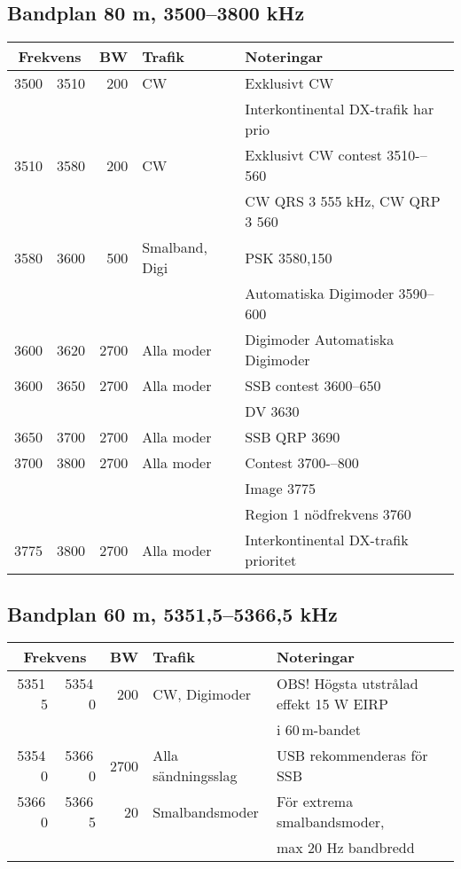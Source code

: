 {\subsection{Bandplan 80 m, 3500--3800 kHz}
\begin{tabular}{rrrll}
\multicolumn{2}{c}{\textbf{Frekvens}} & \textbf{BW} & \textbf{Trafik} & \textbf{Noteringar} \\ \hline
3500 & 3510 & 200  & CW             & Exklusivt CW                         \\
      &       &      &                & Interkontinental DX-trafik har prio  \\ \hline
3510 & 3580 & 200  & CW             & Exklusivt CW contest 3510-–560       \\
      &       &      &                & CW QRS 3 555 kHz, CW QRP 3 560       \\ \hline
3580 & 3600 & 500  & Smalband, Digi & PSK 3580,150                        \\
      &       &      &                & Automatiska Digimoder 3590--600     \\ \hline
3600 & 3620 & 2700 & Alla moder     & Digimoder Automatiska Digimoder      \\ \hline
3600 & 3650 & 2700 & Alla moder     & SSB contest 3600--650               \\
      &       &      &                & DV 3630                             \\ \hline
3650 & 3700 & 2700 & Alla moder     & SSB QRP 3690                        \\ \hline
3700 & 3800 & 2700 & Alla moder     & Contest 3700-–800                   \\
      &       &      &                & Image 3775                          \\
      &       &      &                & Region 1 nödfrekvens 3760           \\ \hline
3775 & 3800 & 2700 & Alla moder     & Interkontinental DX-trafik prioritet \\ \hline
\end{tabular}


\subsection{Bandplan 60 m, 5351,5--5366,5 kHz}
\begin{tabular}{rrrll}
\multicolumn{2}{c}{\textbf{Frekvens}} & \textbf{BW} & \textbf{Trafik} & \textbf{Noteringar} \\ \hline
5351\,5 & 5354\,0 &  200 & CW, Digimoder      & OBS! Högsta utstrålad effekt 15 W EIRP\\
        &         &      &                    & i 60\,m-bandet\\ \hline
5354\,0 & 5366\,0 & 2700 & Alla sändningsslag & USB rekommenderas för SSB\\ \hline
5366\,0 & 5366\,5 &   20 & Smalbandsmoder     & För extrema smalbandsmoder,\\
        &         &      &                    & max 20 Hz bandbredd\\ \hline
\end{tabular}

}
